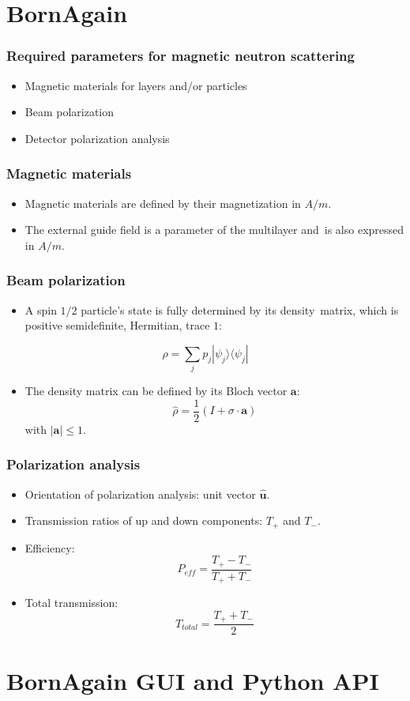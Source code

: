 \documentclass{beamer}
\begin{document}
\section{BornAgain}

\begin{frame}
    \frametitle{Required parameters for magnetic neutron scattering}
    \begin{itemize}
        \item Magnetic materials for layers and/or particles
        \item Beam polarization
        \item Detector polarization analysis
    \end{itemize}
\end{frame}

\begin{frame}
    \frametitle{Magnetic materials}
    \begin{itemize}
        \item Magnetic materials are defined by their magnetization in $A/m$.
        \item The external guide field is a parameter of the multilayer and\
              is also expressed in $A/m$.
    \end{itemize}
\end{frame}

\begin{frame}
    \frametitle{Beam polarization}
    \begin{itemize}
        \item A spin $1/2$ particle's state is fully determined by its density\
              matrix, which is positive semidefinite, Hermitian, trace $1$:
    \end{itemize}
    \[ \hat\rho = \sum_j p_j \left| \psi_j \rangle\langle \psi_j \right| \]
    \begin{itemize}
        \item The density matrix can be defined by its Bloch vector $\mathbf a$:
        \[ \hat\rho = \frac{1}{2}\left( I + \sigma\cdot\mathbf a \right) \]
              with $|\mathbf a| \leq 1$.
    \end{itemize}
    
\end{frame}

\begin{frame}
    \frametitle{Polarization analysis}
    \begin{itemize}
        \item Orientation of polarization analysis: unit vector $\mathbf{\hat u}$.
        \item Transmission ratios of up and down components: $T_+$ and $T_-$.
        \item Efficiency:
              \[ P_{eff} = \frac{T_+ - T_-}{T_+ + T_-} \]
        \item Total transmission:
              \[ T_{total} = \frac{T_+ + T_-}{2} \]
    \end{itemize}
\end{frame}

\section{BornAgain GUI and Python API}
\end{document}
